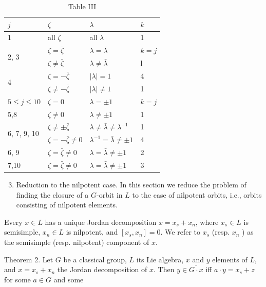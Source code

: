 \documentclass[10pt]{article}
\begin{document}
\begin{table}[h]
\begin{center}
\begin{tabular}[t]{|l|l|l|l|}
\hline
$j$ & $\zeta$ & $\lambda$ & $k$ \\
\hline
1 & all $\zeta$ & all $\lambda$ & 1 \\
\hline
\multirow[t]{2}{*}{2, 3} & $\zeta=\bar{\zeta}$ & $\lambda=\bar{\lambda}$ & $k=j$ \\
\hline
 & $\zeta \neq \bar{\zeta}$ & $\lambda \neq \bar{\lambda}$ & l \\
\hline
\multirow[t]{2}{*}{4} & $\zeta=-\bar{\zeta}$ & $|\lambda|=1$ & 4 \\
\hline
 & $\zeta \neq-\bar{\zeta}$ & $|\lambda| \neq 1$ & 1 \\
\hline
$5 \leqslant j \leqslant 10$ & $\zeta=0$ & $\lambda= \pm 1$ & $k=j$ \\
\hline
5,8 & $\zeta \neq 0$ & $\lambda \neq \pm 1$ & 1 \\
\hline
\multirow[t]{2}{*}{6, 7, 9, 10} & $\zeta \neq \pm \bar{\zeta}$ & $\lambda \neq \bar{\lambda} \neq \lambda^{-1}$ & 1 \\
\hline
 & $\zeta=-\bar{\zeta} \neq 0$ & $\lambda^{-1}=\bar{\lambda} \neq \pm 1$ & 4 \\
\hline
6, 9 & $\zeta=\bar{\zeta} \neq 0$ & $\lambda=\bar{\lambda} \neq \pm 1$ & 2 \\
\hline
7,10 & $\zeta=\bar{\zeta} \neq 0$ & $\lambda=\bar{\lambda} \neq \pm 1$ & 3 \\
\hline
\end{tabular}
\captionsetup{labelformat=empty}
\caption{Table III}
\end{center}
\end{table}

\begin{enumerate}
  \setcounter{enumi}{2}
  \item Reduction to the nilpotent case. In this section we reduce the problem of finding the closure of a $G$-orbit in $L$ to the case of nilpotent orbits, i.e., orbits consisting of nilpotent elements.
\end{enumerate}

Every $x \in L$ has a unique Jordan decomposition $x=x_{s}+x_{n}$, where $x_{s} \in L$ is semisimple, $x_{n} \in L$ is nilpotent, and $\left[x_{s}, x_{n}\right]=0$. We refer to $x_{s}$ (resp. $x_{n}$ ) as the semisimple (resp. nilpotent) component of $x$.

Theorem 2. Let $G$ be a classical group, $L$ its Lie algebra, $x$ and $y$ elements of $L$, and $x=x_{s}+x_{n}$ the Jordan decomposition of $x$. Then $y \in \overline{G \cdot x}$ iff $a \cdot y=x_{s}+z$ for some $a \in G$ and some
\end{document}
